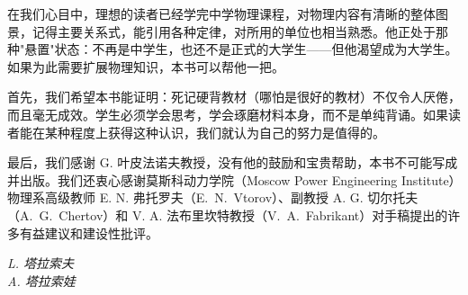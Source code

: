 在我们心目中，理想的读者已经学完中学物理课程，对物理内容有清晰的整体图景，记得主要关系式，能引用各种定律，对所用的单位也相当熟悉。他正处于那种"悬置"状态：不再是中学生，也还不是正式的大学生——但他渴望成为大学生。如果为此需要扩展物理知识，本书可以帮他一把。

首先，我们希望本书能证明：死记硬背教材（哪怕是很好的教材）不仅令人厌倦，而且毫无成效。学生必须学会思考，学会琢磨材料本身，而不是单纯背诵。如果读者能在某种程度上获得这种认识，我们就认为自己的努力是值得的。

最后，我们感谢 G. 叶皮法诺夫教授，没有他的鼓励和宝贵帮助，本书不可能写成并出版。我们还衷心感谢莫斯科动力学院（Moscow Power Engineering Institute）物理系高级教师 E. N. 弗托罗夫（E.~N.~Vtorov）、副教授 A. G. 切尔托夫（A.~G.~Chertov）和 V. A. 法布里坎特教授（V.~A.~Fabrikant）对手稿提出的许多有益建议和建设性批评。

\begin{flushright}
\textit{L. 塔拉索夫}\\
\textit{A. 塔拉索娃}
\end{flushright}

\cleardoublepage
